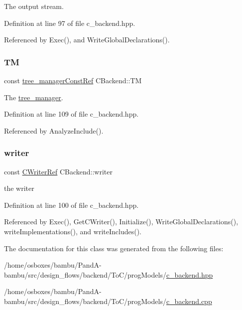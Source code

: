 The output stream. 



Definition at line 97 of file c\+\_\+backend.\+hpp.



Referenced by Exec(), and Write\+Global\+Declarations().

\mbox{\label{classCBackend_a0323ee15f4a2e60c99c730caa2960b5b}} 
\subsubsection{\texorpdfstring{TM}{TM}}
{\footnotesize\ttfamily const \hyperlink{tree__manager_8hpp_a792e3f1f892d7d997a8d8a4a12e39346}{tree\+\_\+manager\+Const\+Ref} C\+Backend\+::\+TM\hspace{0.3cm}{\ttfamily [protected]}}



The \hyperlink{classtree__manager}{tree\+\_\+manager}. 



Definition at line 109 of file c\+\_\+backend.\+hpp.



Referenced by Analyze\+Include().

\mbox{\label{classCBackend_a8ebae22824a6201f7cc467ad69b4450a}} 
\subsubsection{\texorpdfstring{writer}{writer}}
{\footnotesize\ttfamily const \hyperlink{c__writer_8hpp_a4e9c4dfe17e35f981e27b6dd97f9632c}{C\+Writer\+Ref} C\+Backend\+::writer\hspace{0.3cm}{\ttfamily [protected]}}



the writer 



Definition at line 100 of file c\+\_\+backend.\+hpp.



Referenced by Exec(), Get\+C\+Writer(), Initialize(), Write\+Global\+Declarations(), write\+Implementations(), and write\+Includes().



The documentation for this class was generated from the following files\+:\begin{DoxyCompactItemize}
\item 
/home/osboxes/bambu/\+Pand\+A-\/bambu/src/design\+\_\+flows/backend/\+To\+C/prog\+Models/\hyperlink{c__backend_8hpp}{c\+\_\+backend.\+hpp}\item 
/home/osboxes/bambu/\+Pand\+A-\/bambu/src/design\+\_\+flows/backend/\+To\+C/prog\+Models/\hyperlink{c__backend_8cpp}{c\+\_\+backend.\+cpp}\end{DoxyCompactItemize}
